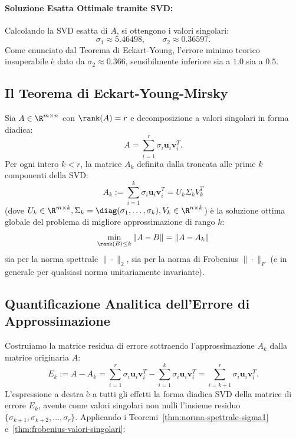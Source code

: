 \paragraph{Soluzione Esatta Ottimale tramite SVD:}
Calcolando la SVD esatta di $A$, si ottengono i valori singolari:
\begin{equation}
    \sigma_1 \approx 5.46498, \qquad \sigma_2 \approx 0.36597.
\end{equation}
Come enunciato dal Teorema di Eckart-Young, l'errore minimo teorico insuperabile \`e dato da $\sigma_2 \approx 0.366$, sensibilmente inferiore sia a $1.0$ sia a $0.5$.

\subsection{Il Teorema di Eckart-Young-Mirsky}

\begin{theorem}
\label{thm:eckart-young}
Sia $A \in \R^{m \times n}$ con $\rank(A) = r$ e decomposizione a valori singolari in forma diadica:
\begin{equation}
    A = \sum_{i=1}^r \sigma_i \mathbf{u}_i \mathbf{v}_i^T.
\end{equation}
Per ogni intero $k < r$, la matrice $A_k$ definita dalla troncata alle prime $k$ componenti della SVD:
\begin{equation}
    A_k := \sum_{i=1}^k \sigma_i \mathbf{u}_i \mathbf{v}_i^T = U_k \Sigma_k V_k^T
\end{equation}
(dove $U_k \in \R^{m \times k}, \Sigma_k = \diag(\sigma_1, \dots, \sigma_k), V_k \in \R^{n \times k}$) \`e la soluzione ottima globale del problema di migliore approssimazione di rango $k$:
\begin{equation}
    \min_{\rank(B) \le k} \|A - B\| = \|A - A_k\|
\end{equation}
sia per la norma spettrale $\|\cdot\|_2$, sia per la norma di Frobenius $\|\cdot\|_F$ (e in generale per qualsiasi norma unitariamente invariante).
\end{theorem}

\subsection{Quantificazione Analitica dell'Errore di Approssimazione}

Costruiamo la matrice residua di errore sottraendo l'approssimazione $A_k$ dalla matrice originaria $A$:
\begin{equation}
    E_k := A - A_k = \sum_{i=1}^r \sigma_i \mathbf{u}_i \mathbf{v}_i^T - \sum_{i=1}^k \sigma_i \mathbf{u}_i \mathbf{v}_i^T = \sum_{i=k+1}^r \sigma_i \mathbf{u}_i \mathbf{v}_i^T.
\end{equation}
L'espressione a destra \`e a tutti gli effetti la forma diadica SVD della matrice di errore $E_k$, avente come valori singolari non nulli l'insieme residuo $\{\sigma_{k+1}, \sigma_{k+2}, \dots, \sigma_r\}$.
Applicando i Teoremi~\ref{thm:norma-spettrale-sigma1} e~\ref{thm:frobenius-valori-singolari}:

